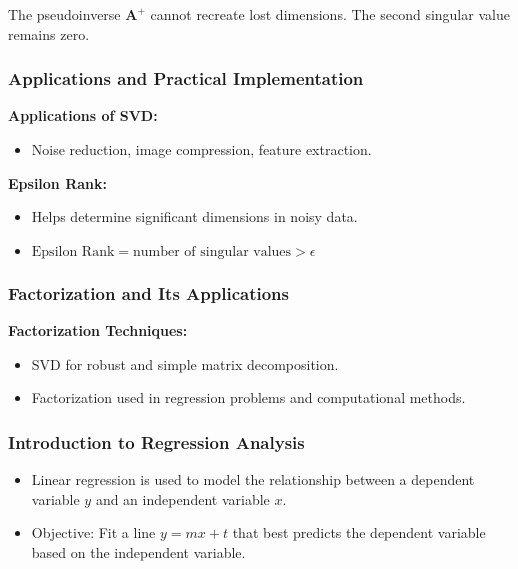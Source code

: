 \documentclass[aspectratio=169]{beamer}
\begin{document}
\begin{frame}
\begin{columns}
\begin{column}{0.4\textwidth}
    \end{column}
\end{columns}

\vspace{0.5cm}
\pause
\centering
{\footnotesize The pseudoinverse \(\mathbf{A}^+\) cannot recreate lost dimensions. The second singular value remains zero.}

\end{frame}


\begin{frame}
\frametitle{Applications and Practical Implementation}\pause
\textbf{Applications of SVD:}
\begin{itemize}
    \item Noise reduction, image compression, feature extraction.
\end{itemize}\pause
\textbf{Epsilon Rank:}
\begin{itemize}
    \item Helps determine significant dimensions in noisy data.
    \item \(\text{Epsilon Rank} = \text{number of singular values} > \epsilon\)
\end{itemize}
\end{frame}



\begin{frame}
\frametitle{Factorization and Its Applications}
\textbf{Factorization Techniques:}
\begin{itemize}
    \item SVD for robust and simple matrix decomposition.
    \item Factorization used in regression problems and computational methods.
\end{itemize}

\end{frame}

\begin{frame}
\frametitle{Introduction to Regression Analysis}
\begin{itemize}
    \item Linear regression is used to model the relationship between a dependent variable \( y \) and an independent variable \( x \).\pause
    \item Objective: Fit a line \( y = mx + t \) that best predicts the dependent variable based on the independent variable.
\end{itemize}
\end{frame}
\end{document}
